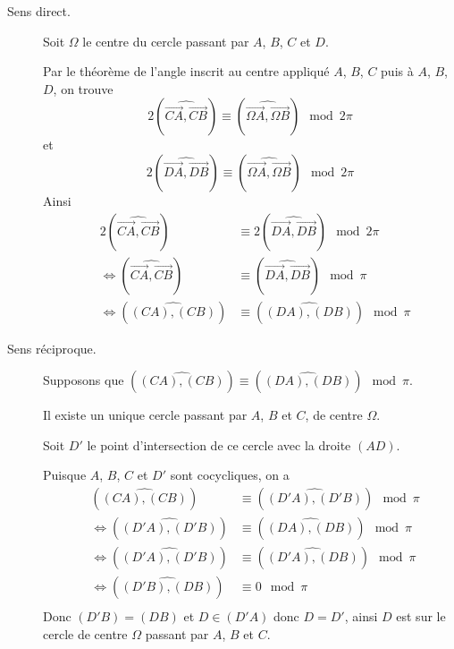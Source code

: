 \documentclass[a4paper,12pt]{article}
\begin{document}
\tikzexternalenable
\begin{figure}[H]
    \centering
    \resizebox{0.9\textwidth}{!}{%
    
    }
\end{figure}
\tikzexternaldisable

\begin{demonstration}
    \begin{description}
        \item[Sens direct.]
        Soit $\Omega$ le centre du cercle passant par $A$, $B$, $C$ et $D$.

        Par le théorème de l'angle inscrit au centre appliqué $A$, $B$, $C$ puis à $A$, $B$, $D$, on trouve
        $$
        2(\widehat{\overrightarrow{CA}, \overrightarrow{CB}}) \equiv (\widehat{\overrightarrow{\Omega A}, \overrightarrow{\Omega B}}) \mod 2\pi
        $$
        et
        $$
        2(\widehat{\overrightarrow{DA}, \overrightarrow{DB}}) \equiv (\widehat{\overrightarrow{\Omega A}, \overrightarrow{\Omega B}}) \mod 2\pi
        $$
        Ainsi
        \begin{align*}
            &2(\widehat{\overrightarrow{CA}, \overrightarrow{CB}}) &\equiv 2(\widehat{\overrightarrow{DA}, \overrightarrow{DB}}) \mod 2\pi \\
            &\iff (\widehat{\overrightarrow{CA}, \overrightarrow{CB}}) &\equiv (\widehat{\overrightarrow{DA}, \overrightarrow{DB}}) \mod \pi \\
            &\iff (\widehat{(CA), (CB)}) &\equiv (\widehat{(DA), (DB)}) \mod \pi
        \end{align*}

        \item[Sens réciproque.]
        Supposons que $(\widehat{(CA), (CB)}) \equiv (\widehat{(DA), (DB)}) \mod \pi$.

        Il existe un unique cercle passant par $A$, $B$ et $C$, de centre $\Omega$.

        Soit $D'$ le point d'intersection de ce cercle avec la droite $(AD)$.

        Puisque $A$, $B$, $C$ et $D'$ sont cocycliques, on a
        \begin{align*}
            &(\widehat{(CA), (CB)}) &\equiv (\widehat{(D'A), (D'B)}) \mod \pi \\
            &\iff (\widehat{(D'A), (D'B)}) &\equiv (\widehat{(DA), (DB)}) \mod \pi \\
            &\iff (\widehat{(D'A), (D'B)}) &\equiv (\widehat{(D'A), (DB)}) \mod \pi \\
            &\iff (\widehat{(D'B), (DB)}) &\equiv 0 \mod \pi \\
        \end{align*}
        Donc $(D'B) = (DB)$ et $D \in (D'A)$ donc $D = D'$, ainsi $D$ est sur le cercle de centre $\Omega$ passant par $A$, $B$ et $C$.
    \end{description}
\end{demonstration}
\end{document}
